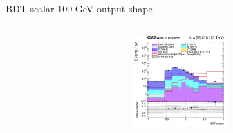 \documentclass[8pt]{beamer}
\begin{document}
\begin{frame}{BDT scalar 100 GeV output shape}
\begin{columns}
\begin{column}{0.33\textwidth}
\begin{center}
			\begin{block}{}\end{block}	
     			\includegraphics[width=1.0\textwidth, height=100pt]{figs/2018/SmearSR-ttDM-scalar100/log_cratio_ST_topCR_ll_BDT_ttDM100_ST_BDT_output_scalar100_customBinsAttempt7.png}
    		\end{center}		
		\end{column}
\end{columns}


\end{frame}
\end{document}
